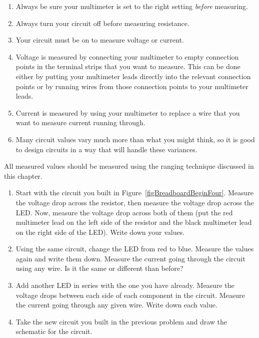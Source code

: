\begin{enumerate}
\item Always be sure your multimeter is set to the right setting \emph{before} measuring.
\item Always turn your circuit off before measuring resistance.
\item Your circuit must be on to measure voltage or current.
\item Voltage is measured by connecting your multimeter to empty connection points in the terminal strips that you want to measure.  This can be done either by putting your multimeter leads directly into the relevant connection points or by running wires from those connection points to your multimeter leads.
\item Current is measured by using your multimeter to replace a wire that you want to measure current running through.
\item Many circuit values vary much more than what you might think, so it is good to design circuits in a way that will handle these variances.
\end{enumerate}

\applysection

All measured values should be measured using the ranging technique discussed in this chapter.

\begin{enumerate}
\item Start with the circuit you built in Figure~\ref{figBreadboardBeginFour}.  Measure the voltage drop across the resistor, then measure the voltage drop across the LED.  Now, measure the voltage drop across both of them (put the red multimeter lead on the left side of the resistor and the black multimeter lead on the right side of the LED).  Write down your values.
\item Using the same circuit, change the LED from red to blue.   Measure the values again and write them down.  Measure the current going through the circuit using any wire.  Is it the same or different than before?
\item Add another LED in series with the one you have already.  Measure the voltage drops between each side of each component in the circuit.  Measure the current going through any given wire.  Write down each value.
\item Take the new circuit you built in the previous problem and draw the schematic for the circuit.
\end{enumerate}
